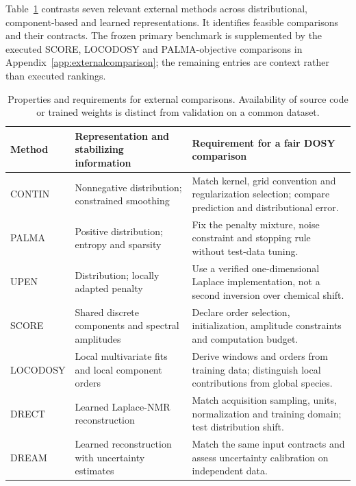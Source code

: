 Table~\ref{tab:externalmethods} contrasts seven relevant external methods across distributional, component-based and learned representations. It identifies feasible comparisons and their contracts. The frozen primary benchmark is supplemented by the executed SCORE, LOCODOSY and PALMA-objective comparisons in Appendix~\ref{app:externalcomparison}; the remaining entries are context rather than executed rankings.
\begin{table}[htbp]
\caption{Properties and requirements for external comparisons. Availability of source code or trained weights is distinct from validation on a common dataset.}\label{tab:externalmethods}
\centering\small
\begin{tabularx}{\textwidth}{>{\raggedright\arraybackslash}p{}*{2}{>{\raggedright\arraybackslash}X}}
\toprule
Method & Representation and stabilizing information & Requirement for a fair DOSY comparison\\
\midrule
CONTIN \cite{contin} & Nonnegative distribution; constrained smoothing & Match kernel, grid convention and regularization selection; compare prediction and distributional error.\\
PALMA \cite{palma} & Positive distribution; entropy and sparsity & Fix the penalty mixture, noise constraint and stopping rule without test-data tuning.\\
UPEN \cite{upen} & Distribution; locally adapted penalty & Use a verified one-dimensional Laplace implementation, not a second inversion over chemical shift.\\
SCORE \cite{score} & Shared discrete components and spectral amplitudes & Declare order selection, initialization, amplitude constraints and computation budget.\\
LOCODOSY \cite{locodosy} & Local multivariate fits and local component orders & Derive windows and orders from training data; distinguish local contributions from global species.\\
DRECT \cite{drect} & Learned Laplace-NMR reconstruction & Match acquisition sampling, units, normalization and training domain; test distribution shift.\\
DREAM \cite{dream} & Learned reconstruction with uncertainty estimates & Match the same input contracts and assess uncertainty calibration on independent data.\\
\bottomrule
\end{tabularx}
\end{table}

